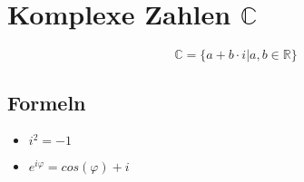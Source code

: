 \section{Komplexe Zahlen $\mathbb{C}$}
\begin{equation*}
    \mathbb{C} = \{a+b \cdot i | a, b \in \mathbb{R}\}
\end{equation*}

\subsection{Formeln}
\begin{itemize}
    \item $i^2 = -1$
    \item $e^{i\varphi} = cos(\varphi) + i$
\end{itemize}
